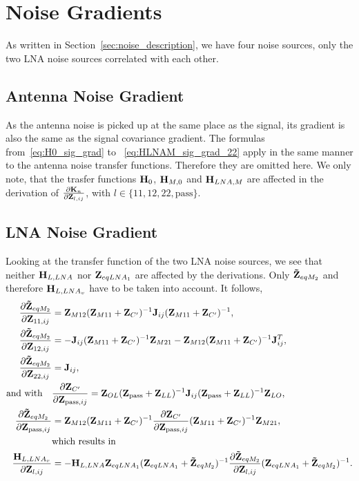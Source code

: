 \section{Noise Gradients}
\label{sec:noise_gradient}

As written in Section~\ref{sec:noise_description}, we have four noise sources, only the two LNA noise sources correlated with each other.

\subsection{Antenna Noise Gradient}
\label{sec:ant_noise_grad}
As the antenna noise is picked up at the same place as the signal, its gradient is also the same as the signal covariance gradient.
The formulas from~\eqref{eq:H0_sig_grad} to ~\eqref{eq:HLNAM_sig_grad_22} apply in the same manner to the antenna noise transfer functions.
Therefore they are omitted here.
We only note, that the trasfer functions $\mathbf{H}_{0}$, $\mathbf{H}_{M,0}$ and $\mathbf{H}_{LNA,M}$ are affected in the derivation of $\frac{\partial\mathbf{K}_n}{\partial\mathbf{Z}_{l,ij}}$, with $l\in\{11,12,22,\text{pass}\}$.

\subsection{LNA Noise Gradient}
\label{sec:lna_noise_grad}

Looking at the transfer function of the two LNA noise sources, we see that neither $\mathbf{H}_{L,LNA}$ nor $\mathbf{Z}_{eqLNA_1}$ are affected by the derivations.
Only $\mathbf{\tilde{Z}}_{eqM_2}$ and therefore $\mathbf{H}_{L,LNA_v}$ have to be taken into account.
It follows,
\begin{align}
\label{eq:HLNAM_sig_grad}
\frac{\partial\mathbf{\tilde{Z}}_{eqM_2}}{\partial\mathbf{Z}_{11,ij}}&=
\mathbf{Z}_{M12}(\mathbf{Z}_{M11} + \mathbf{Z}_{C'})^{-1}\mathbf{J}_{ij}(\mathbf{Z}_{M11} + \mathbf{Z}_{C'})^{-1},\\
\frac{\partial\mathbf{\tilde{Z}}_{eqM_2}}{\partial\mathbf{Z}_{12,ij}}&=
-\mathbf{J}_{ij}(\mathbf{Z}_{M11} + \mathbf{Z}_{C'})^{-1}\mathbf{Z}_{M21} - \mathbf{Z}_{M12}(\mathbf{Z}_{M11} + \mathbf{Z}_{C'})^{-1}\mathbf{J}_{ij}^T,\\
\frac{\partial\mathbf{\tilde{Z}}_{eqM_2}}{\partial\mathbf{Z}_{22,ij}}&=\mathbf{J}_{ij},\\\nonumber
\text{and with}\quad&\frac{\partial\mathbf{Z}_{C'}}{\partial\mathbf{Z}_{\text{pass},ij}} = 
\mathbf{Z}_{OL}(\mathbf{Z}_{\text{pass}}+\mathbf{Z}_{LL})^{-1}\mathbf{J}_{ij}(\mathbf{Z}_{\text{pass}}+\mathbf{Z}_{LL})^{-1}\mathbf{Z}_{LO},\\
\frac{\partial\mathbf{\tilde{Z}}_{eqM_2}}{\partial\mathbf{Z}_{\text{pass},ij}}&=
\mathbf{Z}_{M12}(\mathbf{Z}_{M11} + \mathbf{Z}_{C'})^{-1}\frac{\partial\mathbf{Z}_{C'}}{\partial\mathbf{Z}_{\text{pass},ij}}(\mathbf{Z}_{M11} + \mathbf{Z}_{C'})^{-1}\mathbf{Z}_{M21},\\\nonumber\qquad&\text{which results in}\\
\frac{\mathbf{H}_{L,LNA_v}}{\partial\mathbf{Z}_{l,ij}}&=-\mathbf{H}_{L,LNA}\mathbf{Z}_{eqLNA_1}(\mathbf{Z}_{eqLNA_1} + \mathbf{\tilde{Z}}_{eqM_2})^{-1}\frac{\partial\mathbf{\tilde{Z}}_{eqM_2}}{\partial\mathbf{Z}_{l,ij}}(\mathbf{Z}_{eqLNA_1} + \mathbf{\tilde{Z}}_{eqM_2})^{-1}.
\label{eq:HLNAM_sig_grad_22}
\end{align}


